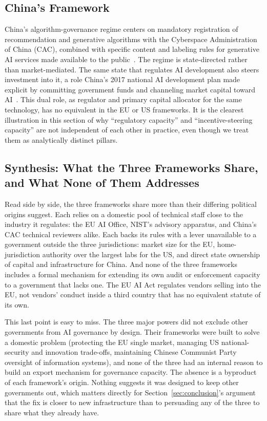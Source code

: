 \documentclass{ieeeaccess}
\begin{document}
\subsection{China's Framework}

China's algorithm-governance regime centers on mandatory registration of recommendation and generative algorithms with the Cyberspace Administration of China (CAC), combined with specific content and labeling rules for generative AI services made available to the public~\cite{cac2023interim}.
The regime is state-directed rather than market-mediated. The same state that regulates AI development also steers investment into it, a role China's 2017 national AI development plan made explicit by committing government funds and channeling market capital toward AI~\cite{china2017aiplan}.
This dual role, as regulator and primary capital allocator for the same technology, has no equivalent in the EU or US frameworks. It is the clearest illustration in this section of why ``regulatory capacity'' and ``incentive-steering capacity'' are not independent of each other in practice, even though we treat them as analytically distinct pillars.

\subsection{Synthesis: What the Three Frameworks Share, and What None of Them Addresses}

Read side by side, the three frameworks share more than their differing political origins suggest. Each relies on a domestic pool of technical staff close to the industry it regulates: the EU AI Office, NIST's advisory apparatus, and China's CAC technical reviewers alike. Each backs its rules with a lever unavailable to a government outside the three jurisdictions: market size for the EU, home-jurisdiction authority over the largest labs for the US, and direct state ownership of capital and infrastructure for China. And none of the three frameworks includes a formal mechanism for extending its own audit or enforcement capacity to a government that lacks one. The EU AI Act regulates vendors selling into the EU, not vendors' conduct inside a third country that has no equivalent statute of its own.

This last point is easy to miss. The three major powers did not exclude other governments from AI governance by design. Their frameworks were built to solve a domestic problem (protecting the EU single market, managing US national-security and innovation trade-offs, maintaining Chinese Communist Party oversight of information systems), and none of the three had an internal reason to build an export mechanism for governance capacity. The absence is a byproduct of each framework's origin. Nothing suggests it was designed to keep other governments out, which matters directly for Section~\ref{sec:conclusion}'s argument that the fix is closer to new infrastructure than to persuading any of the three to share what they already have.
\end{document}
